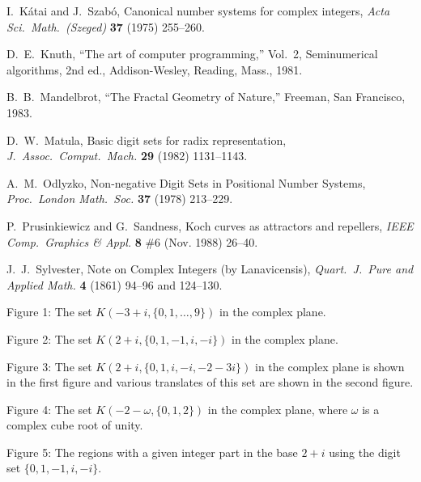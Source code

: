 \documentclass[12pt]{article}
\begin{document}
\begin{thebibliography}{10}
 {\sc I.~K\'atai and J.~Szab\'o,} 
Canonical number systems for complex integers, 
{\em Acta Sci.\ Math.\ (Szeged)} {\bf 37} (1975) 255--260.


 {\sc D.~E.~Knuth,} 
``The art of computer programming,'' Vol.~2, Seminumerical algorithms, 
2nd ed., Addison-Wesley, Reading, Mass., 1981.


 {\sc B.~B.~Mandelbrot}, 
``The Fractal Geometry of Nature,''
Freeman, San Francisco, 1983.

 {\sc D.~W.~Matula,} 
Basic digit sets for radix representation,
{\em J.\ Assoc.\ Comput.\ Mach.} {\bf 29} (1982) 1131--1143.

 {\sc A.~M.~Odlyzko,} 
Non-negative Digit Sets in Positional Number Systems,
{\em Proc.\ London Math.\ Soc.} {\bf 37} (1978) 213--229.

 {\sc P.~Prusinkiewicz and G.~Sandness,} 
Koch curves as attractors and repellers, 
{\em IEEE Comp.\ Graphics \& Appl.} {\bf 8} \#6 (Nov. 1988)
26--40.

 {\sc J.~J.~Sylvester,} 
Note on Complex Integers (by Lanavicensis), 
{\em Quart.\ J.\ Pure and Applied Math. } {\bf 4} (1861)
94--96 and 124--130.

\end{thebibliography}

\newpage

\noindent
Figure 1: The set $K(-3 + i, \{0, 1,\ldots, 9\})$ in the complex plane.
\vspace*{5mm}

\noindent
Figure 2: The set $K(2 + i, \{0, 1, -1, i, -i\})$ in the complex plane.
\vspace*{5mm}

\noindent
Figure 3: The set $K(2 + i, \{0, 1, i, -i, -2 - 3i\})$ in the complex plane is shown in the first figure and various translates of this set are shown in the second figure.
\vspace*{5mm}

\noindent
Figure 4: The set $K(-2 - \omega, \{0, 1, 2\})$ in the complex plane, where $\omega$ is a complex cube root of unity.
\vspace*{5mm}

\noindent
Figure 5: The regions with a given integer part in the base $2 + i$ using the
digit set $\{0, 1, -1, i, -i\}$.
	
\end{document}
